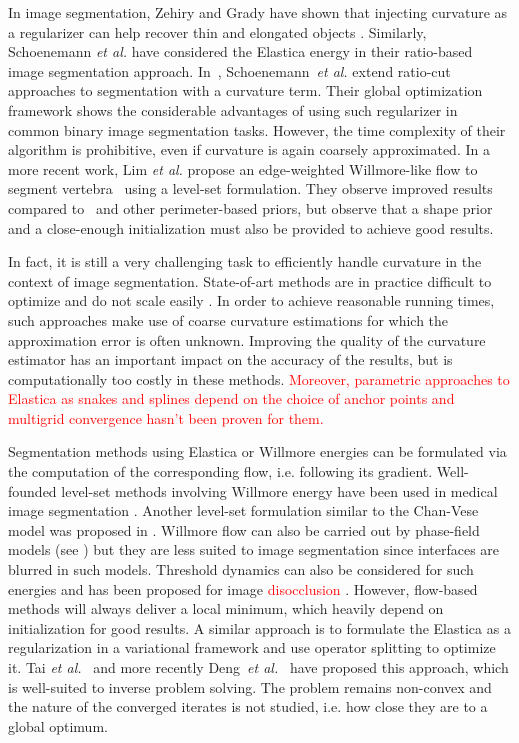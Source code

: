 \documentclass[smallextended]{svjour3}       %
\newcommand{\revision}[1]{\textcolor{red}{#1}}
\begin{document}
In image segmentation, Zehiry and Grady have shown that injecting
curvature as a regularizer can help recover thin and elongated objects
\cite{zehiry10fast}. Similarly, Schoenemann {\em et al.}
\cite{schoenemann09linear} have considered the Elastica energy in
their ratio-based image segmentation
approach. In~\cite{schoenemann2011elastic}, Schoenemann~{\em et al.}
extend ratio-cut approaches to segmentation with a curvature
term. Their global optimization framework shows the considerable
advantages of using such regularizer in common binary image
segmentation tasks.  However, the time complexity of their algorithm
is prohibitive, even if curvature is again coarsely
approximated.  In a more recent work, Lim {\em et al.} propose an
edge-weighted Willmore-like flow to segment
vertebra~\cite{lim2012introducing} using a level-set
formulation. They observe improved results compared
to~\cite{caseles97geodesic} and other perimeter-based priors, but
observe that a shape prior and a close-enough initialization must also be
provided to achieve good results.

In fact, it is still a very challenging task to efficiently handle
curvature in the context of image segmentation.  State-of-art methods
are in practice difficult to optimize and do not scale easily
\cite{zehiry10fast,schoenemann09linear,strandmark11globalframework,nieuwenhuis14efficient}. In
order to achieve reasonable running times, such approaches make use of
coarse curvature estimations for which the approximation error is
often unknown. Improving the quality of the curvature estimator has an
important impact on the accuracy of the results, but is
computationally too costly in these methods. \revision{Moreover, parametric approaches to Elastica  as snakes and splines depend on the choice of anchor points and  multigrid convergence hasn't been proven for them.}

Segmentation methods using Elastica or Willmore energies can be
formulated via the computation of the corresponding flow,
i.e. following its gradient. Well-founded level-set methods involving
Willmore energy \cite{droske2004level} have been used in medical image
segmentation \cite{lim2012introducing}. Another level-set formulation
similar to the Chan-Vese model was proposed in
\cite{zhu2013image}. Willmore flow can also be carried out by
phase-field models (see \cite{bretin2015phase}) but they are less
suited to image segmentation since interfaces are blurred in such
models. Threshold dynamics can also be considered for such energies
\cite{esedoglu2008threshold} and has been proposed for image
\revision{disocclusion} \cite{esedoglu2005threshold}. However, flow-based methods
will always deliver a local minimum, which heavily depend on
initialization for good results. A similar approach is to formulate
the Elastica as a regularization in a variational framework and use
operator splitting to optimize it. Tai {\em et
  al.}~\cite{tai11elastica} and more recently Deng~{\em et
  al.}~\cite{deng2019new} have proposed this approach, which is
well-suited to inverse problem solving. The problem remains non-convex
and the nature of the converged iterates is not studied, i.e. how
close they are to a global optimum.
\end{document}
